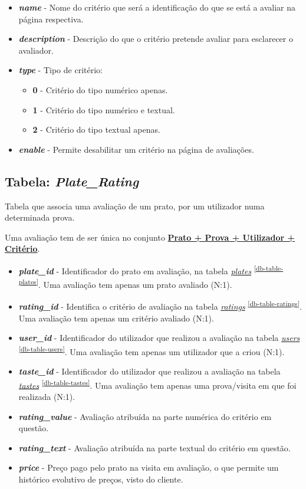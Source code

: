 \documentclass[11pt, a4paper, sans]{article}
\begin{document}
	\begin{itemize}
		\item \textbf{\textit{name}} - Nome do critério que será a identificação do que se está a avaliar
			na página respectiva.
		\item \textbf{\textit{description}} - Descrição do que o critério pretende avaliar para esclarecer
			o avaliador.
		\item \textbf{\textit{type}} - Tipo de critério:
			\begin{itemize}
				\item \textbf{0} - Critério do tipo numérico apenas.
				\item \textbf{1} - Critério do tipo numérico e textual.
				\item \textbf{2} - Critério do tipo textual apenas.
			\end{itemize}
		\item \textbf{\textit{enable}} - Permite desabilitar um critério na página de avaliações.
	\end{itemize}

	\subsection{Tabela: \textit{Plate\_Rating}} \label{db-table-plate-rating}
	
	Tabela que associa uma avaliação de um prato, por um utilizador numa determinada prova. 
	
	Uma avaliação tem de ser única no conjunto \underline{\textbf{Prato + Prova + Utilizador + Critério}}.
	
	\begin{itemize}
		\item \textbf{\textit{plate\_id}} - Identificador do prato em avaliação, na tabela 
			\underline{\textit{plates}} \textsuperscript{\ref{db-table-plates}}. 
			Uma avaliação tem apenas um prato avaliado (N:1).
		\item \textbf{\textit{rating\_id}} - Identifica o critério de avaliação na tabela 
			\underline{\textit{ratings}} \textsuperscript{\ref{db-table-ratings}}.
			Uma avaliação tem apenas um critério avaliado (N:1).
		\item \textbf{\textit{user\_id}} - Identificador do utilizador que realizou a avaliação na tabela 
			\underline{\textit{users}} \textsuperscript{\ref{db-table-users}}.
			Uma avaliação tem apenas um utilizador que a criou (N:1).
		\item \textbf{\textit{taste\_id}} - Identificador do utilizador que realizou a avaliação na tabela 
			\underline{\textit{tastes}} \textsuperscript{\ref{db-table-tastes}}.
			Uma avaliação tem apenas uma prova/visita em que foi realizada (N:1).
		\item \textbf{\textit{rating\_value}} - Avaliação atribuída na parte numérica do critério em questão.
		\item \textbf{\textit{rating\_text}} - Avaliação atribuída na parte textual do critério em questão.
		\item \textbf{\textit{price}} - Preço pago pelo prato na visita em avaliação, o que permite um histórico
			evolutivo de preços, visto do cliente.
	\end{itemize}
\end{document}
